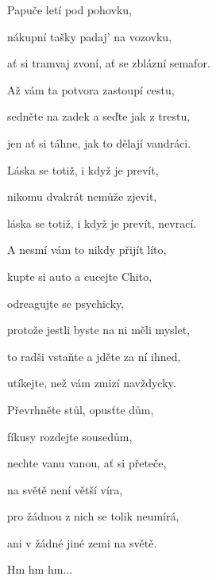 Papuče letí pod pohovku,

nákupní tašky padaj' na vozovku,

ať si tramvaj zvoní, ať se zblázní semafor.
\kr

\zs
Až vám ta potvora zastoupí cestu,

sedněte na zadek a seďte jak z trestu,

jen ať si táhne, jak to dělají vandráci.

Láska se totiž, i když je prevít,

nikomu dvakrát nemůže zjevit,

láska se totiž, i když je prevít, nevrací.
\ks

\zs
A nesmí vám to nikdy přijít líto,

kupte si auto a cucejte Chito,

odreagujte se psychicky,

protože jestli byste na ni měli myslet,

to radši vstaňte a jděte za ní ihned,

utíkejte, než vám zmizí navždycky.
\ks

\zr
Převrhněte stůl, opusťte dům,

fíkusy rozdejte sousedům,

nechte vanu vanou, ať si přeteče,

na světě není větší víra,

pro žádnou z nich se tolik neumírá,

ani v žádné jiné zemi na světě.
\kr

\zr
Hm hm hm...
\kr

\kp
